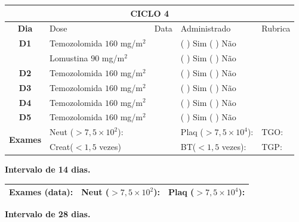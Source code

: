\documentclass[11pt,a4paper,oldfontcommands]{memoir}
\begin{document}
\begin{center}
\begin{longtable}{p{1cm}p{4cm}|p{1cm}|p{4.6cm}|p{3cm}}
	\hline
	\multicolumn{5}{c}{\textbf{CICLO 4}}\\
\hline
    \multicolumn{1}{c|}{\multirow{1}{*}{\textbf{Dia}}}&{Dose}&{Data}&{Administrado}&{Rubrica} \\
    \hline
    \multicolumn{1}{c|}{\multirow{1}{*}{\textbf{D1}}}&{Temozolomida \(160\) mg/m\(^2\)}&&{(  ) Sim (  ) Não}&\\
    \multicolumn{1}{c|}{\multirow{1}{*}{\textbf{}}}&{Lomustina \(90\) mg/m\(^2\)}&&{(  ) Sim (  ) Não}&\\
    \multicolumn{1}{c|}{\multirow{1}{*}{\textbf{D2}}}&{Temozolomida \(160\) mg/m\(^2\)}&&{(  ) Sim (  ) Não}&\\
    \multicolumn{1}{c|}{\multirow{1}{*}{\textbf{D3}}}&{Temozolomida \(160\) mg/m\(^2\)}&&{(  ) Sim (  ) Não}&\\
    \multicolumn{1}{c|}{\multirow{1}{*}{\textbf{D4}}}&{Temozolomida \(160\) mg/m\(^2\)}&&{(  ) Sim (  ) Não}&\\
    \multicolumn{1}{c|}{\multirow{1}{*}{\textbf{D5}}}&{Temozolomida \(160\) mg/m\(^2\)}&&{(  ) Sim (  ) Não}&\\
    \hline
    \multicolumn{1}{c|}{\multirow{2}{*}{\textbf{Exames}}}&\multicolumn{2}{l|}{Neut (\(>7,5\times10^2\)):}&{Plaq (\(>7,5\times10^4\)):}&{TGO:}\\
    \cline{2-5}
    \multicolumn{1}{c|}{\multirow{2}{*}{{}}}&\multicolumn{2}{l|}{Creat(\(<1,5\) vezes)}&{BT(\(<1,5\) vezes):}&{TGP:}
    \\
    \hline
\end{longtable}
\textbf{Intervalo de 14 dias.}
\begin{longtable}{p{5cm}|p{5cm}|p{4.5cm}}
    \hline
    \textbf{Exames (data):}&{Neut (\(>7,5\times10^2\)):}&{Plaq (\(>7,5\times10^4\)):}
    \\
    \hline
\end{longtable}
\textbf{Intervalo de 28 dias.}
\\[1.5cm]
\end{center}
\clearpage
\end{document}
